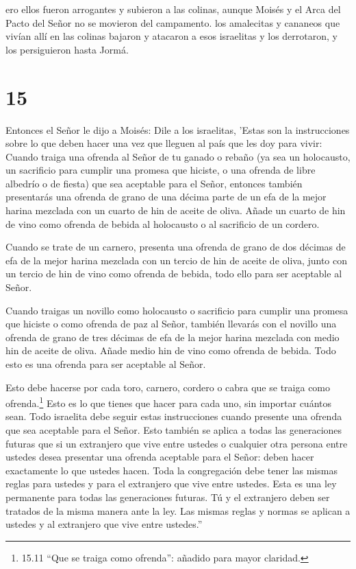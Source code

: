  ero ellos fueron arrogantes y subieron a las colinas,
aunque Moisés y el Arca del Pacto del Señor no se movieron del
campamento.  los amalecitas y cananeos que vivían allí en
las colinas bajaron y atacaron a esos israelitas y los derrotaron, y los
persiguieron hasta Jormá.

\hypertarget{section-14}{%
\section{15}\label{section-14}}

 Entonces el Señor le dijo a Moisés:  Dile a los
israelitas, 'Estas son la instrucciones sobre lo que deben hacer una vez
que lleguen al país que les doy para vivir:  Cuando traiga
una ofrenda al Señor de tu ganado o rebaño (ya sea un holocausto, un
sacrificio para cumplir una promesa que hiciste, o una ofrenda de libre
albedrío o de fiesta) que sea aceptable para el Señor, 
entonces también presentarás una ofrenda de grano de una décima parte de
un efa de la mejor harina mezclada con un cuarto de hin de aceite de
oliva.  Añade un cuarto de hin de vino como ofrenda de
bebida al holocausto o al sacrificio de un cordero.

 Cuando se trate de un carnero, presenta una ofrenda de
grano de dos décimas de efa de la mejor harina mezclada con un tercio de
hin de aceite de oliva,  junto con un tercio de hin de vino
como ofrenda de bebida, todo ello para ser aceptable al Señor.

 Cuando traigas un novillo como holocausto o sacrificio para
cumplir una promesa que hiciste o como ofrenda de paz al Señor,
 también llevarás con el novillo una ofrenda de grano de
tres décimas de efa de la mejor harina mezclada con medio hin de aceite
de oliva.  Añade medio hin de vino como ofrenda de bebida.
Todo esto es una ofrenda para ser aceptable al Señor.

 Esto debe hacerse por cada toro, carnero, cordero o cabra
que se traiga como ofrenda.\footnote{15.11 ``Que se traiga como
  ofrenda'': añadido para mayor claridad.}  Esto es lo que
tienes que hacer para cada uno, sin importar cuántos sean. 
Todo israelita debe seguir estas instrucciones cuando presente una
ofrenda que sea aceptable para el Señor.  Esto también se
aplica a todas las generaciones futuras que si un extranjero que vive
entre ustedes o cualquier otra persona entre ustedes desea presentar una
ofrenda aceptable para el Señor: deben hacer exactamente lo que ustedes
hacen.  Toda la congregación debe tener las mismas reglas
para ustedes y para el extranjero que vive entre ustedes. Esta es una
ley permanente para todas las generaciones futuras. Tú y el extranjero
deben ser tratados de la misma manera ante la ley.  Las
mismas reglas y normas se aplican a ustedes y al extranjero que vive
entre ustedes.''

